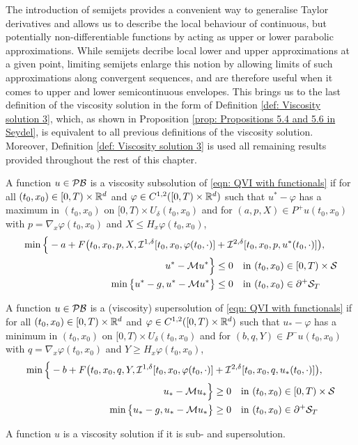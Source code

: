 The introduction of semijets provides a convenient way to generalise Taylor derivatives and allows us to describe the local behaviour of continuous, but potentially non-differentiable functions by acting as upper or lower parabolic approximations. While semijets decribe local lower and upper approximations at a given point, limiting semijets enlarge this notion by allowing limits of such approximations along convergent sequences, and are therefore useful when it comes to upper and lower semicontinuous envelopes. This brings us to the last definition of the viscosity solution in the form of Definition \ref{def: Viscosity solution 3}, which, as shown in Proposition \ref{prop: Propositions 5.4 and 5.6 in Seydel}, is equivalent to all previous definitions of the viscosity solution. Moreover, Definition \ref{def: Viscosity solution 3} is used all remaining results provided throughout the rest of this chapter.

\begin{definition}
\label{def: Viscosity solution 3}
    A function $u \in \mathcal{PB}$ is a viscosity subsolution of \eqref{eqn: QVI with functionals} if for all $(t_0,x_0) \in [0,T)\times \mathbb{R}^d$ and $\varphi \in C^{1,2}([0,T)\times \mathbb{R}^d)$ such that $u^* - \varphi$ has a maximum in $(t_0,x_0)$ on $[0,T) \times U_\delta(t_0,x_0)$ and for $(a,p,X) \in P^+u(t_0,x_0)$ with $p=\nabla_x \varphi (t_0,x_0)$ and $X \leq H_x \varphi (t_0,x_0)$,
    \begin{align*}
        \min \Big\{ - a + F\big(t_0,x_0,p,X,\mathcal{I}^{1,\delta}[t_0,x_0,\varphi(t_0,\cdot)] &+ \mathcal{I}^{2,\delta}[t_0,x_0,p,u^*(t_0,\cdot)] \big), \\ 
        u^* - \mathcal{M} u^* \Big\} & \leq 0  \quad \text{in } (t_0,x_0) \in [0,T) \times  \mathcal{S} \\
        \min \big\{ u^* - g, u^* - \mathcal{M} u^* \big\} &\leq 0 \quad \text{in } (t_0,x_0) \in \partial^+ \mathcal{S}_T
    \end{align*}

    A function $u \in \mathcal{PB}$ is a (viscosity) supersolution of \eqref{eqn: QVI with functionals} if for all $(t_0,x_0) \in [0,T) \times \mathbb{R}^d$ and $\varphi \in C^{1,2}([0,T)\times \mathbb{R}^d)$ such that $u_* - \varphi$ has a minimum in $(t_0,x_0)$ on $[0,T) \times U_\delta(t_0,x_0)$ and for $(b,q,Y) \in P^- u(t_0,x_0)$ with $q= \nabla_x \varphi(t_0,x_0)$ and $Y \geq H_x \varphi(t_0,x_0)$, 
    \begin{align*}
        \min \Big\{ - b + F\big(t_0,x_0,q,Y,\mathcal{I}^{1,\delta}[t_0,x_0,\varphi(t_0,\cdot)] &+ \mathcal{I}^{2,\delta}[t_0,x_0,q,u_*(t_0,\cdot)] \big), \\ 
        u_* - \mathcal{M} u_* \Big\} & \geq 0  \quad \text{in } (t_0,x_0) \in [0,T) \times \mathcal{S} \\
        \min \big\{ u_* - g, u_* - \mathcal{M} u_* \big\} &\geq 0 \quad \text{in } (t_0,x_0) \in \partial^+ \mathcal{S}_T
    \end{align*}

    A function $u$ is a viscosity solution if it is sub- and supersolution. 
\end{definition}

